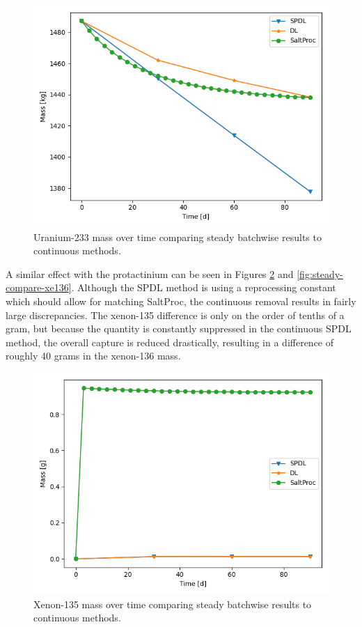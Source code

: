 \begin{figure}[H]
  \centering
  \includegraphics[scale=0.7]{images/soln-1-u233.png}
  \caption{Uranium-233 mass over time comparing steady batchwise results to continuous methods.}
   \label{fig:steady-compare-u233}
\end{figure}

A similar effect with the protactinium can be seen in Figures \ref{fig:steady-compare-xe135} and \ref{fig:steady-compare-xe136}. Although the SPDL method is using a reprocessing constant which should allow for matching SaltProc, the continuous removal results in fairly large discrepancies. The xenon-135 difference is only on the order of tenths of a gram, but because the quantity is constantly suppressed in the continuous SPDL method, the overall capture is reduced drastically, resulting in a difference of roughly 40 grams in the xenon-136 mass.

\begin{figure}[H]
  \centering
  \includegraphics[scale=0.7]{images/soln-1-xe135.png}
  \caption{Xenon-135 mass over time comparing steady batchwise results to continuous methods.}
   \label{fig:steady-compare-xe135}
\end{figure}

